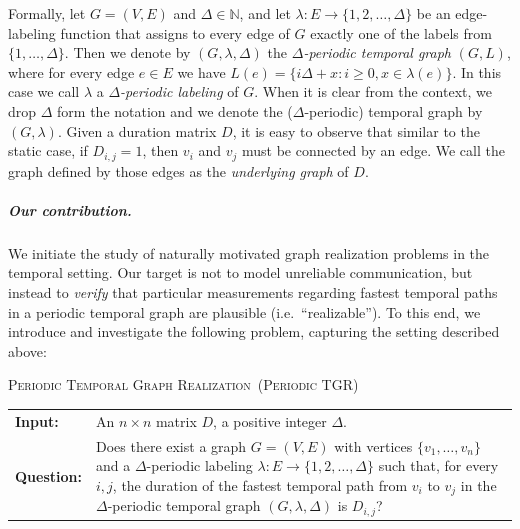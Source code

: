\documentclass[a4paper,UKenglish,cleveref, autoref, thm-restate]{lipics-v2021}
\makeatletter
\newcommand{\problemdef}[3]{
	\begin{center}
		\begin{minipage}{0.95\textwidth}
			\noindent
			#1
			\vspace{5pt}\\
			\setlength{\tabcolsep}{3pt}
			\begin{tabularx}{\textwidth}{@{}lX@{}}
				\textbf{Input:}& #2 \\
				\textbf{Question:}& #3
			\end{tabularx}
		\end{minipage}
	\end{center}
}
\newcommand{\deltaExactLong}{\textsc{Periodic Temporal Graph Realization}}
\newcommand{\deltaExact}{\textsc{Periodic TGR}}
\makeatother
\begin{document}





Formally, let $G=(V,E)$ and $\Delta\in \mathbb{N}$, and let $\lambda: E \rightarrow \{1,2,\ldots,\Delta\}$ be an edge-labeling function that assigns to every edge of $G$ exactly one of the labels from $\{1,\ldots,\Delta\}$. 
Then we denote by $(G,\lambda,\Delta)$ the \emph{$\Delta$-periodic temporal graph} $(G,L)$, where for every edge $e\in E$ we have $L(e)=\{i\Delta + x : i\geq 0, x\in \lambda(e)\}$. 
In this case we call $\lambda$ a \emph{$\Delta$-periodic labeling} of $G$. 
When it is clear from the context, we drop $\Delta$ form the notation and 
we denote the ($\Delta$-periodic) temporal graph by $(G,\lambda)$.
Given a duration matrix $D$, it is easy to observe that similar to the static case, if $D_{i,j}=1$, then $v_i$ and $v_j$ must be connected by an edge. We call the graph defined by those edges as the \emph{underlying graph} of $D$.





\subparagraph{Our contribution.}
We initiate the study of naturally motivated graph realization problems in the temporal setting. 
Our target is not to model unreliable communication, but instead to \emph{verify} that particular measurements regarding fastest temporal paths in a periodic temporal graph are plausible (i.e.~``realizable''). 
To this end, we introduce and investigate the following problem, capturing the setting described above:
	
	
\problemdef{\deltaExactLong\ (\deltaExact)}
{An $n \times n$ matrix $D$, a positive integer $\Delta$.}
{Does there exist a graph $G=(V,E)$ with vertices $\{v_1,\ldots,v_{n}\}$ 
and a $\Delta$-periodic labeling $\lambda: E \rightarrow \{1,2,\ldots,\Delta\}$ such that, 
for every $i,j$, the duration of the fastest temporal path from $v_i$ to $v_j$ in the $\Delta$-periodic temporal graph $(G,\lambda,\Delta)$ is $D_{i,j}$?}
\end{document}
